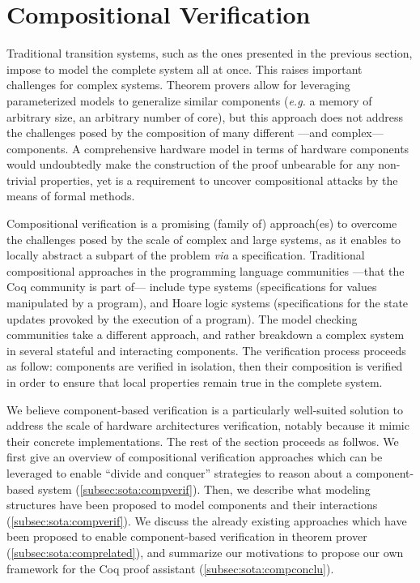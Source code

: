 \section{Compositional Verification}
\label{section:sota:compsec}

Traditional transition systems, such as the ones presented in the previous
section, impose to model the complete system all at once.
%
This raises important challenges for complex systems.
%
Theorem provers allow for leveraging parameterized models to generalize similar
components (\emph{e.g.} a memory of arbitrary size, an arbitrary number of
core), but this approach does not address the challenges posed by the
composition of many different ---and complex--- components.
%
A comprehensive hardware model in terms of hardware components would undoubtedly
make the construction of the proof unbearable for any non-trivial properties,
yet is a requirement to uncover compositional attacks by the means of formal
methods.
%

Compositional verification is a promising (family of) approach(es) to overcome
the challenges posed by the scale of complex and large systems, as it enables to
locally abstract a subpart of the problem \emph{via} a specification.
%
Traditional compositional approaches in the programming language communities
---that the Coq community is part of--- include type
systems%
(specifications for values manipulated by a program), and Hoare logic systems
(specifications for the state updates provoked by the execution of a program).
%
The model checking communities take a different approach, and rather breakdown a
complex system in several stateful and interacting components.
%
The verification process proceeds as follow: components are verified in
isolation, then their composition is verified in order to ensure that local
properties remain true in the complete system.

We believe component-based verification is a particularly well-suited solution
to address the scale of hardware architectures verification, notably because it
mimic their concrete implementations.
%
The rest of the section proceeds as follwos.
%
We first give an overview of compositional verification approaches which can be
leveraged to enable ``divide and conquer'' strategies to reason about a
component-based system (\ref{subsec:sota:compverif}).
%
Then, we describe what modeling structures have been proposed to model
components and their interactions (\ref{subsec:sota:compverif}).
%
We discuss the already existing approaches which have been proposed to enable
component-based verification in theorem prover (\ref{subsec:sota:comprelated}),
and summarize our motivations to propose our own framework for the Coq proof
assistant (\ref{subsec:sota:compconclu}).

